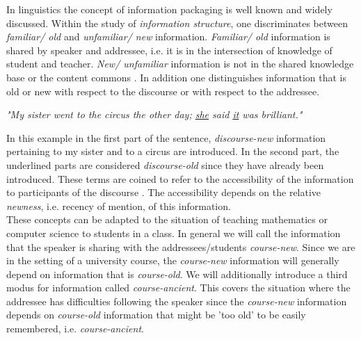 \documentclass[twoside, 12pt]{article}
\begin{document}
In linguistics the concept of information packaging \cite{CambridgeGrammar:npentrel14} is well known and widely discussed. Within the study of \textit{information structure}, one discriminates between \textit{familiar/ old} and \textit{unfamiliar/ new} information. \textit{Familiar/ old} information is shared by speaker and addressee, i.e. it is in the intersection of knowledge of student and teacher. \textit{New/ unfamiliar} information is not in the shared knowledge base or the content commons \cite{CNX:whitepaper}. In addition one distinguishes information that is old or new with respect to the discourse or with respect to the addressee.

\begin{center}
\textit{"My sister went to the circus the other day; \underline{she} said \underline{it} was brilliant."}\\
\end{center}

In this example in the first part of the sentence, \textit{discourse-new} information pertaining to my sister and to a circus are introduced. In the second part, the underlined parts are considered \textit{discourse-old} since they have already been introduced. These terms are coined to refer to the accessibility of the information to participants of the discourse \cite{Newness:npentrel14}. The accessibility depends on the relative \textit{newness}, i.e. recency of mention, of this information.\\

These concepts can be adapted to the situation of teaching mathematics or computer science to students in a class. In general we will call the information that the speaker is sharing with the addressees/students \textit{course-new}. Since we are in the setting of a university course, the \textit{course-new} information will generally depend on information that is \textit{course-old}. We will additionally introduce a third modus for information called \textit{course-ancient}. This covers the situation where the addressee has difficulties following the speaker since the \textit{course-new} information depends on \textit{course-old} information that might be 'too old' to be easily remembered, i.e. \textit{course-ancient}.\\
\end{document}
